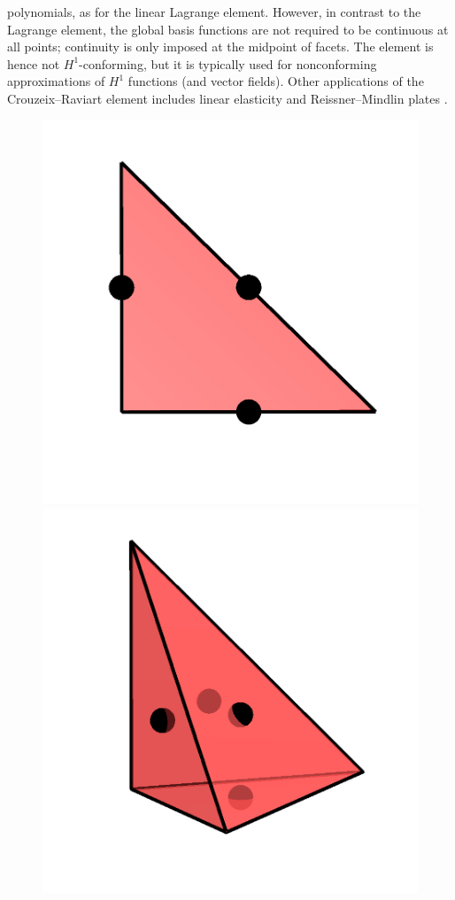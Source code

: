\noindent polynomials, as for the linear Lagrange element. However, in contrast to
the Lagrange element, the global basis functions are not required to be
continuous at all points; continuity is only imposed at the midpoint of
facets. The element is hence not $H^1$-conforming, but it is typically
used for nonconforming approximations of $H^1$ functions (and vector
fields). Other applications of the Crouzeix--Raviart element includes
linear elasticity \citep{HansboLarson2003} and Reissner--Mindlin plates
\citep{ArnoldFalk1989}.

\begin{figure}
  \centering
  \includegraphics[width=\twofigs]{chapters/kirby-6/png/CR1_2d.png}
  \includegraphics[width=\twofigs]{chapters/kirby-6/png/CR1_3d.png}

\end{figure}
